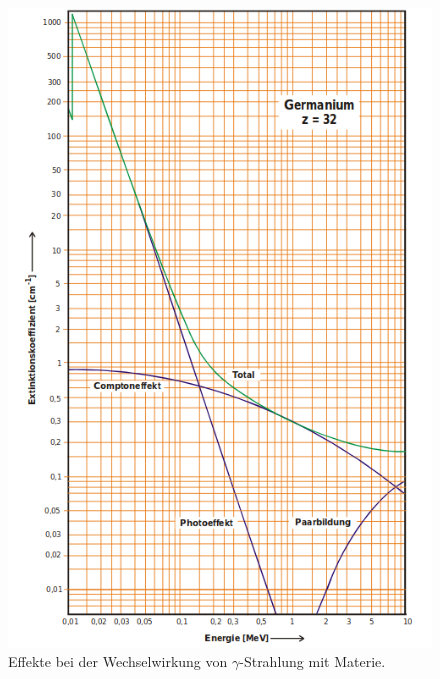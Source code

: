 \begin{figure}
  \centering
  \includegraphics[scale=0.8]{Wechselwirkungen.png}
  \caption{Effekte bei der Wechselwirkung von $\gamma$-Strahlung mit Materie. \cite{Q2}}
  \label{abb:1}
\end{figure}

